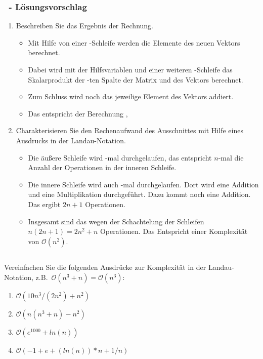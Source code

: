 \begin{frame}%
  \frametitle{\sAtitle\ - L\"osungsvorschlag}%

\begin{enumerate}
  \item Beschreiben Sie das Ergebnis der Rechnung.
  \begin{itemize}
    \item Mit Hilfe von einer -Schleife werden die Elemente des neuen Vektors  berechnet.
    \item Dabei wird mit der Hilfsvariablen  und einer weiteren -Schleife das Skalarprodukt der -ten Spalte der Matrix  und des Vektors  berechnet.
    \item Zum Schluss wird noch das jeweilige Element des Vektors  addiert.
    \item Das entspricht der Berechnung ,
  \end{itemize}
  \item Charakterisieren Sie den Rechenaufwand des Ausschnittes mit Hilfe eines Ausdrucks in der Landau-Notation.
  \begin{itemize}
  \item Die \"au\ss ere Schleife wird -mal durchgelaufen, das entspricht $n$-mal die Anzahl der Operationen in der inneren Schleife.
  \item Die innere Schleife wird auch -mal durchgelaufen.
  Dort wird eine Addition und eine  Multiplikation durchgef\"uhrt.
  Dazu kommt noch eine Addition.
  Das ergibt $2n+1$ Operationen.
  \item Insgesamt sind  das wegen der Schachtelung der Schleifen $n(2n+1)=2n^2+n$ Operationen.
  Das Entspricht einer Komplexit\"at von $\mathcal{O}(n^2)$.
  \end{itemize}
\end{enumerate}
\end{frame}


\subsection{\sBtitle}
\begin{frame}%
  \frametitle{\sBtitle}%

Vereinfachen Sie die folgenden Ausdr\"ucke zur Komplexit\"at in der Landau-Notation, z.B.~$\mathcal{O}(n^3+n) = \mathcal{O}(n^3)$:
\begin{enumerate}
  \item $\mathcal{O}(10n^3/(2n^2)+n^2)$
  \item $\mathcal{O}(n(n^3+n)-n^2)$
  \item $\mathcal{O}(e^{1000}+ln (n))$
  \item $\mathcal{O}(-1+e+(ln(n))*n +1/n )$
\end{enumerate}
\end{frame}

